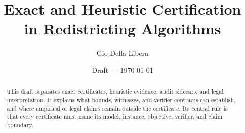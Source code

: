\documentclass[12pt]{article}
\title{Exact and Heuristic Certification in Redistricting Algorithms}
\author{Gio Della-Libera}
\date{Draft --- \today}
\begin{document}
\maketitle

\begin{abstract}
This draft separates exact certificates, heuristic evidence, audit sidecars,
and legal interpretation. It explains what bounds, witnesses, and verifier
contracts can establish, and where empirical or legal claims remain outside the
certificate. Its central rule is that every certificate must name its model,
instance, objective, verifier, and claim boundary.
\end{abstract}








\nocite{bisect-u13-plan}


\end{document}
